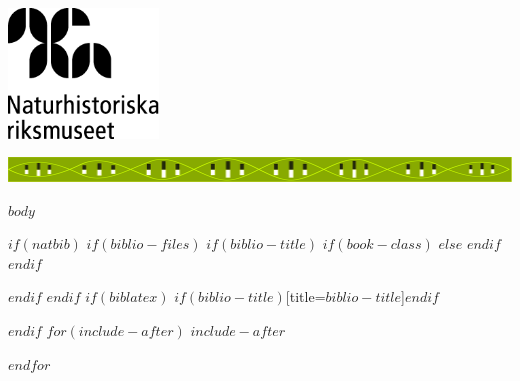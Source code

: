 \usepackage{geometry}
\usepackage{fancyhdr}
\usepackage[swedish]{babel}
\usepackage{graphics}
\usepackage{float}
\pagestyle{fancy}



\pagestyle{fancyplain}
\begin{titlepage}
    \raggedright{
    \includegraphics[width=4cm]{naturhistoriska-riksmuseet.png}}
    \vspace*{\fill}
    \vspace*{\fill}
    \vspace*{\fill}
    \centerline{\includegraphics[width=1.25\linewidth]{CGIbanner.pdf}}
    \vspace*{\fill}
\end{titlepage}

$body$

$if(natbib)$
$if(biblio-files)$
$if(biblio-title)$
$if(book-class)$
\renewcommand\bibname{$biblio-title$}
$else$
\renewcommand\refname{$biblio-title$}
$endif$
$endif$


$endif$
$endif$
$if(biblatex)$
\printbibliography$if(biblio-title)$[title=$biblio-title$]$endif$

$endif$
$for(include-after)$
$include-after$

$endfor$

